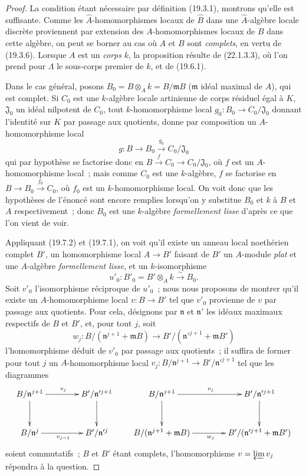 \begin{proof}
La condition étant nécessaire par définition (19.3.1), montrons qu'elle est
suffisante. Comme les $\widehat A$-homomorphismes locaux de $\widehat B$ dans
une $\widehat A$-algèbre locale discrète proviennent par extension des
$A$-homomorphismes locaux de $B$ dans cette algèbre, on peut se borner au cas
où $A$ et $B$ sont \emph{complets}, en vertu de (19.3.6). Lorsque $A$ est un
\emph{corps} $k$, la proposition résulte de (22.1.3.3), où l'on prend pour
$\Lambda$ le sous-corps premier de $k$, et de (19.6.1).

Dans le cas général, posons $B_0=B\otimes_Ak=B/\mathfrak mB$
($\mathfrak m$ idéal maximal de $A$), qui est complet. Si $C_0$ est une
$k$-algèbre locale artinienne de corps résiduel égal à $K$, $\mathfrak J_0$
un idéal nilpotent de $C_0$, tout $k$-homomorphisme local
$g_0:B_0\to C_0/\mathfrak J_0$ donnant l'identité sur $K$ par passage aux
quotients, donne par composition un $A$-homomorphisme local
\[
  g:B\longrightarrow B_0\xrightarrow{g_0}C_0/\mathfrak J_0
\]
qui par hypothèse se factorise donc en
$B\xrightarrow{f}C_0\to C_0/\mathfrak J_0$, où $f$ est un
$A$-homomorphisme local~; mais comme $C_0$ est une $k$-algèbre, $f$ se
factorise en $B\to B_0\xrightarrow{f_0}C_0$, où $f_0$ est un
$k$-homomorphisme local. On voit donc que les hypothèses de l'énoncé sont
encore remplies lorsqu'on y substitue $B_0$ et $k$ à $B$ et $A$
respectivement~; donc $B_0$ est une $k$-algèbre \emph{formellement lisse}
d'après ce que l'on vient de voir.

Appliquant (19.7.2) et (19.7.1), on voit qu'il existe un anneau local
noethérien complet $B'$, un homomorphisme local $A\to B'$ faisant de $B'$ un
$A$-module \emph{plat} et une $A$-algèbre \emph{formellement lisse}, et un
$k$-isomorphisme
\[
  u'_0:B'_0=B'\otimes_Ak\xrightarrow{\sim}B_0.
\]
Soit $v'_0$ l'isomorphisme réciproque de $u'_0$~; nous nous proposons de
montrer qu'il existe un $A$-homomorphisme local $v:B\to B'$ tel que $v'_0$
provienne de $v$ par passage aux quotients. Pour cela, désignons par
$\mathfrak n$ et $\mathfrak n'$ les idéaux maximaux respectifs de $B$ et
$B'$, et, pour tout $j$, soit
\[
  w_j:B/(\mathfrak n^{j+1}+\mathfrak mB)
  \longrightarrow B'/(\mathfrak n'^{j+1}+\mathfrak mB')
\]
l'homomorphisme déduit de $v'_0$ par passage aux quotients~; il suffira de
former pour tout $j$ un $A$-homomorphisme local
$v_j:B/\mathfrak n^{j+1}\to B'/\mathfrak n'^{j+1}$ tel que les diagrammes
\[
\xymatrix@C=4em@R=3em{
  B/\mathfrak n^{j+1} \ar[r]^{v_j} \ar[d] &
  B'/\mathfrak n'^{j+1} \ar[d] \\
  B/\mathfrak n^j \ar[r]_{v_{j-1}} & B'/\mathfrak n'^j
}
\qquad
\xymatrix@C=4em@R=3em{
  B/\mathfrak n^{j+1} \ar[r]^{v_j} \ar[d] &
  B'/\mathfrak n'^{j+1} \ar[d] \\
  B/(\mathfrak n^{j+1}+\mathfrak mB) \ar[r]_{w_j} &
  B'/(\mathfrak n'^{j+1}+\mathfrak mB')
}
\]
soient commutatifs~; $B$ et $B'$ étant complets, l'homomorphisme
$v=\varprojlim v_j$ répondra à la question.


\end{proof}
